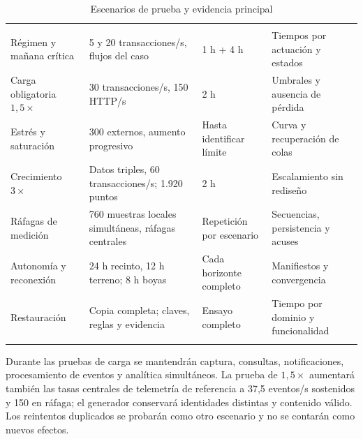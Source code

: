 \begingroup
\setlength{\tabcolsep}{3pt}
\begin{longtable}{@{}L{.24\textwidth}L{.31\textwidth}L{.17\textwidth}L{\dimexpr.28\textwidth-18pt\relax}@{}}
\caption{Escenarios de prueba y evidencia principal}\label{tab:sd5_plan_pruebas}\\
\hline
{} &  &  &  \\ \hline
\endfirsthead
\hline
{} &  &  &  \\ \hline
\endhead
Régimen y mañana crítica & 5 y 20 transacciones/s, flujos del caso & 1 h + 4 h & Tiempos por actuación y estados \\ \addlinespace \hline
Carga obligatoria \(1{,}5\times\) & 30 transacciones/s, 150 HTTP/s & 2 h & Umbrales y ausencia de pérdida \\ \addlinespace \hline
Estrés y saturación & 300 externos, aumento progresivo & Hasta identificar límite & Curva y recuperación de colas \\ \addlinespace \hline
Crecimiento \(3\times\) & Datos triples, 60 transacciones/s; 1.920 puntos & 2 h & Escalamiento sin rediseño \\ \addlinespace \hline
Ráfagas de medición & 760 muestras locales simultáneas, ráfagas centrales & Repetición por escenario & Secuencias, persistencia y acuses \\ \addlinespace \hline
Autonomía y reconexión & 24 h recinto, 12 h terreno; 8 h boyas & Cada horizonte completo & Manifiestos y convergencia \\ \addlinespace \hline
Restauración & Copia completa; claves, reglas y evidencia & Ensayo completo & Tiempo por dominio y funcionalidad \\ \addlinespace \hline
\end{longtable}
\endgroup

Durante las pruebas de carga se mantendrán captura, consultas, notificaciones, procesamiento de eventos y analítica simultáneos. La prueba de \(1{,}5\times\) aumentará también las tasas centrales de telemetría de referencia a 37,5 eventos/s sostenidos y 150 en ráfaga; el generador conservará identidades distintas y contenido válido. Los reintentos duplicados se probarán como otro escenario y no se contarán como nuevos efectos.

